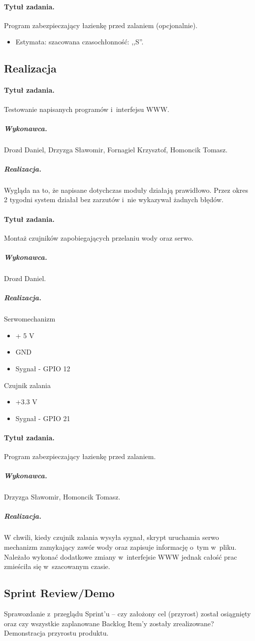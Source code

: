 \paragraph{Tytuł zadania.} Program zabezpieczający łazienkę przed zalaniem (opcjonalnie).
\begin{itemize}
	\item Estymata: szacowana czasochłonność: ,,S''.
\end{itemize}


\subsection{Realizacja}

\paragraph{Tytuł zadania.} Testowanie napisanych programów i~interfejsu WWW.
\subparagraph{Wykonawca.} Drozd Daniel, Drzyzga Sławomir, Fornagiel Krzysztof, Homoncik Tomasz.
\subparagraph{Realizacja.}
Wygląda na to, że napisane dotychczas moduły działają prawidłowo. Przez okres 2 tygodni system działał bez zarzutów i~nie wykazywał żadnych błędów.

\paragraph{Tytuł zadania.} Montaż czujników zapobiegających przelaniu wody oraz serwo.
\subparagraph{Wykonawca.} Drozd Daniel.
\subparagraph{Realizacja.} 
Serwomechanizm

\begin{itemize}
	\item + 5 V
	\item GND
	\item Sygnał - GPIO 12
\end{itemize}
Czujnik zalania
\begin{itemize}
	\item +3.3 V
	\item Sygnał - GPIO 21
\end{itemize}

\paragraph{Tytuł zadania.} Program zabezpieczający łazienkę przed zalaniem.
\subparagraph{Wykonawca.} Drzyzga Sławomir, Homoncik Tomasz.
\subparagraph{Realizacja.} 
W chwili, kiedy czujnik zalania wysyła sygnał, skrypt uruchamia serwo mechanizm zamykający zawór wody oraz zapisuje informację o~tym w~pliku. Należało wykonać dodatkowe zmiany w~interfejsie WWW jednak całość prac zmieściła się w~szacowanym czasie.



\subsection{Sprint Review/Demo}
Sprawozdanie z~przeglądu Sprint'u -- czy założony cel (przyrost) został osiągnięty oraz czy wszystkie zaplanowane Backlog Item'y zostały zrealizowane? Demonstracja przyrostu produktu.
